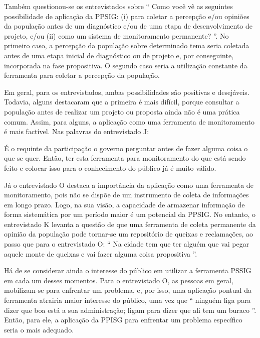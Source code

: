 \documentclass{article}
\begin{document}
Também questionou-se os entrevistados sobre “%
Como você vê as seguintes
						possibilidade de aplicação da PPSIG: (i) para coletar a percepção e/ou
						opiniões da população antes de um diagnóstico e/ou de uma etapa de
						desenvolvimento de projeto, e/ou (ii) como um sistema de monitoramento
						permanente?%
”. No primeiro caso, a percepção da população sobre
					determinado tema seria coletada antes de uma etapa inicial de diagnóstico ou de
					projeto e, por conseguinte, incorporada na fase propositiva. O segundo caso
					seria a utilização constante da ferramenta para coletar a percepção da
					população.

Em geral, para os entrevistados, ambas possibilidades são positivas e desejáveis.
					Todavia, alguns destacaram que a primeira é mais difícil, porque consultar a
					população antes de realizar um projeto ou proposta ainda não é uma prática
					comum. Assim, para alguns, a aplicação como uma ferramenta de monitoramento é
					mais factível. Nas palavras do entrevistado J: 

É o requinte da participação o governo perguntar antes de fazer alguma coisa
						o que se quer. Então, ter esta ferramenta para monitoramento do que está
						sendo feito e colocar isso para o conhecimento do público já é muito válido.
					

Já o entrevistado O destaca a importância da aplicação como uma ferramenta de
					monitoramento, pois não se dispõe de um instrumento de coleta de informações em
					longo prazo. Logo, na sua visão, a capacidade de armazenar informação de forma
					sistemática por um período maior é um potencial da PPSIG. No entanto, o
					entrevistado K levanta a questão de que uma ferramenta de coleta permanente da
					opinião da população pode tornar-se um repositório de queixas e reclamações, ao
					passo que para o entrevistado O: “%
Na cidade tem que ter alguém que vai
						pegar aquele monte de queixas e vai fazer alguma coisa
					propositiva%
”.

Há de se considerar ainda o interesse do público em utilizar a ferramenta PSSIG
					em cada um desses momentos. Para o entrevistado O, as pessoas em geral,
					mobilizam-se para enfrentar um problema, e, por isso, uma aplicação pontual da
					ferramenta atrairia maior interesse do público, uma vez que “%
ninguém
						liga para dizer que boa está a sua administração; ligam para dizer que ali
						tem um buraco%
”. Então, para ele, a aplicação da PPISG para
					enfrentar um problema específico seria o mais adequado.
\end{document}
